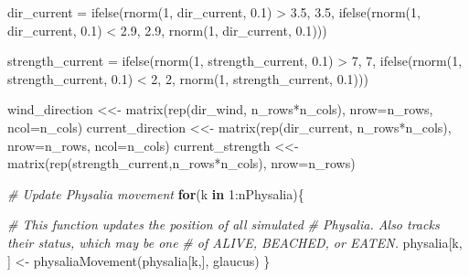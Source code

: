 \documentclass[
]{article}
\newenvironment{Shaded}{\begin{snugshade}}{\end{snugshade}}
\newcommand{\AttributeTok}[1]{\textcolor[rgb]{0.77,0.63,0.00}{#1}}
\newcommand{\CommentTok}[1]{\textcolor[rgb]{0.56,0.35,0.01}{\textit{#1}}}
\newcommand{\ControlFlowTok}[1]{\textcolor[rgb]{0.13,0.29,0.53}{\textbf{#1}}}
\newcommand{\DecValTok}[1]{\textcolor[rgb]{0.00,0.00,0.81}{#1}}
\newcommand{\FloatTok}[1]{\textcolor[rgb]{0.00,0.00,0.81}{#1}}
\newcommand{\FunctionTok}[1]{\textcolor[rgb]{0.00,0.00,0.00}{#1}}
\newcommand{\NormalTok}[1]{#1}
\newcommand{\OtherTok}[1]{\textcolor[rgb]{0.56,0.35,0.01}{#1}}
\newcommand{\SpecialCharTok}[1]{\textcolor[rgb]{0.00,0.00,0.00}{#1}}
\begin{document}
\begin{Shaded}
\begin{Highlighting}[]
    
\NormalTok{    dir\_current }\OtherTok{=} \FunctionTok{ifelse}\NormalTok{(}\FunctionTok{rnorm}\NormalTok{(}\DecValTok{1}\NormalTok{, dir\_current, }\FloatTok{0.1}\NormalTok{) }\SpecialCharTok{\textgreater{}} \FloatTok{3.5}\NormalTok{, }\FloatTok{3.5}\NormalTok{, }
                         \FunctionTok{ifelse}\NormalTok{(}\FunctionTok{rnorm}\NormalTok{(}\DecValTok{1}\NormalTok{, dir\_current, }\FloatTok{0.1}\NormalTok{) }\SpecialCharTok{\textless{}} \FloatTok{2.9}\NormalTok{, }\FloatTok{2.9}\NormalTok{,}
                                \FunctionTok{rnorm}\NormalTok{(}\DecValTok{1}\NormalTok{, dir\_current, }\FloatTok{0.1}\NormalTok{)))}
    
\NormalTok{    strength\_current }\OtherTok{=} \FunctionTok{ifelse}\NormalTok{(}\FunctionTok{rnorm}\NormalTok{(}\DecValTok{1}\NormalTok{, strength\_current, }\FloatTok{0.1}\NormalTok{) }\SpecialCharTok{\textgreater{}} \DecValTok{7}\NormalTok{, }\DecValTok{7}\NormalTok{, }
                         \FunctionTok{ifelse}\NormalTok{(}\FunctionTok{rnorm}\NormalTok{(}\DecValTok{1}\NormalTok{, strength\_current, }\FloatTok{0.1}\NormalTok{) }\SpecialCharTok{\textless{}} \DecValTok{2}\NormalTok{, }\DecValTok{2}\NormalTok{,}
                                \FunctionTok{rnorm}\NormalTok{(}\DecValTok{1}\NormalTok{, strength\_current, }\FloatTok{0.1}\NormalTok{)))}
    
\NormalTok{    wind\_direction }\OtherTok{\textless{}\textless{}{-}} \FunctionTok{matrix}\NormalTok{(}\FunctionTok{rep}\NormalTok{(dir\_wind, n\_rows}\SpecialCharTok{*}\NormalTok{n\_cols), }
                              \AttributeTok{nrow=}\NormalTok{n\_rows, }\AttributeTok{ncol=}\NormalTok{n\_cols)}
\NormalTok{    current\_direction }\OtherTok{\textless{}\textless{}{-}} \FunctionTok{matrix}\NormalTok{(}\FunctionTok{rep}\NormalTok{(dir\_current, n\_rows}\SpecialCharTok{*}\NormalTok{n\_cols), }
                                 \AttributeTok{nrow=}\NormalTok{n\_rows, }\AttributeTok{ncol=}\NormalTok{n\_cols)}
\NormalTok{    current\_strength }\OtherTok{\textless{}\textless{}{-}} \FunctionTok{matrix}\NormalTok{(}\FunctionTok{rep}\NormalTok{(strength\_current,n\_rows}\SpecialCharTok{*}\NormalTok{n\_cols), }
                                \AttributeTok{nrow=}\NormalTok{n\_rows)}
    
    \CommentTok{\# Update Physalia movement}
    \ControlFlowTok{for}\NormalTok{(k }\ControlFlowTok{in} \DecValTok{1}\SpecialCharTok{:}\NormalTok{nPhysalia)\{}
      
      \CommentTok{\# This function updates the position of all simulated}
      \CommentTok{\# Physalia. Also tracks their \textquotesingle{}status\textquotesingle{}, which may be one}
      \CommentTok{\# of \textquotesingle{}ALIVE\textquotesingle{}, \textquotesingle{}BEACHED\textquotesingle{}, or \textquotesingle{}EATEN\textquotesingle{}.}
\NormalTok{      physalia[k, ] }\OtherTok{\textless{}{-}} \FunctionTok{physaliaMovement}\NormalTok{(physalia[k,], glaucus)}
\NormalTok{    \}}
    

\end{Highlighting}
\end{Shaded}
\end{document}
